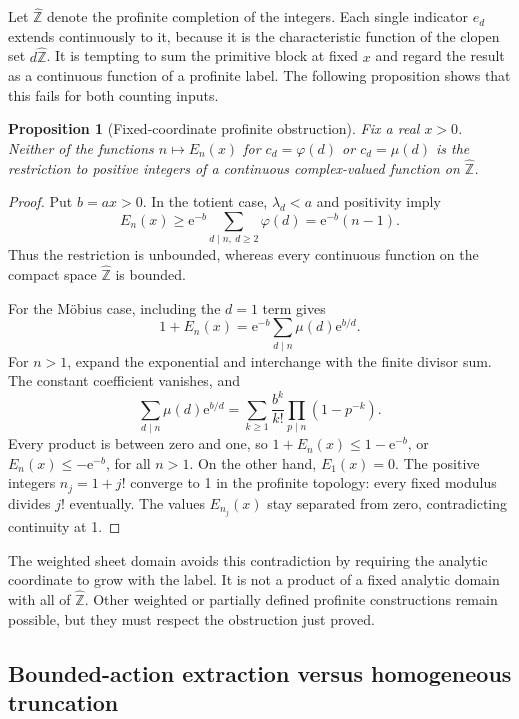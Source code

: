 \documentclass[11pt,a4paper]{article}
\numberwithin{equation}{section}
\newtheorem{proposition}[theorem]{Proposition}
\theoremstyle{definition}
\theoremstyle{remark}
\newcommand{\ee}{\mathrm e}
\begin{document}
Let $\widehat{\mathbb Z}$ denote the profinite completion of the
integers. Each single indicator $e_d$ extends continuously to it, because
it is the characteristic function of the clopen set $d\widehat{\mathbb Z}$.
It is tempting to sum the primitive block at fixed $x$ and regard the
result as a continuous function of a profinite label. The following
proposition shows that this fails for both counting inputs.

\begin{proposition}[Fixed-coordinate profinite obstruction]
\label{prop:profinite}
Fix a real $x>0$. Neither of the functions
$n\mapsto E_n(x)$ for $c_d=\varphi(d)$ or $c_d=\mu(d)$ is the
restriction to positive integers of a continuous complex-valued function
on $\widehat{\mathbb Z}$.
\end{proposition}
\begin{proof}
Put $b=ax>0$. In the totient case, $\lambda_d<a$ and positivity imply
\[
 E_n(x)\ge\ee^{-b}\sum_{d\mid n,\ d\ge2}\varphi(d)
 =\ee^{-b}(n-1).
\]
Thus the restriction is unbounded, whereas every continuous function on
the compact space $\widehat{\mathbb Z}$ is bounded.

For the M\"obius case, including the $d=1$ term gives
\[
 1+E_n(x)=\ee^{-b}\sum_{d\mid n}\mu(d)\ee^{b/d}.
\]
For $n>1$, expand the exponential and interchange with the finite
divisor sum. The constant coefficient vanishes, and
\begin{equation}
 \sum_{d\mid n}\mu(d)\ee^{b/d}
 =\sum_{k\ge1}\frac{b^k}{k!}
       \prod_{p\mid n}(1-p^{-k}).
 \label{eq:muprof}
\end{equation}
Every product is between zero and one, so
$1+E_n(x)\le1-\ee^{-b}$, or $E_n(x)\le-\ee^{-b}$, for all $n>1$.
On the other hand, $E_1(x)=0$. The positive integers $n_j=1+j!$
converge to 1 in the profinite topology: every fixed modulus divides
$j!$ eventually. The values $E_{n_j}(x)$ stay separated from zero,
contradicting continuity at 1.
\end{proof}

The weighted sheet domain avoids this contradiction by requiring the
analytic coordinate to grow with the label. It is not a product of a
fixed analytic domain with all of $\widehat{\mathbb Z}$. Other weighted
or partially defined profinite constructions remain possible, but they
must respect the obstruction just proved.

\subsection{Bounded-action extraction versus homogeneous truncation}
\end{document}
